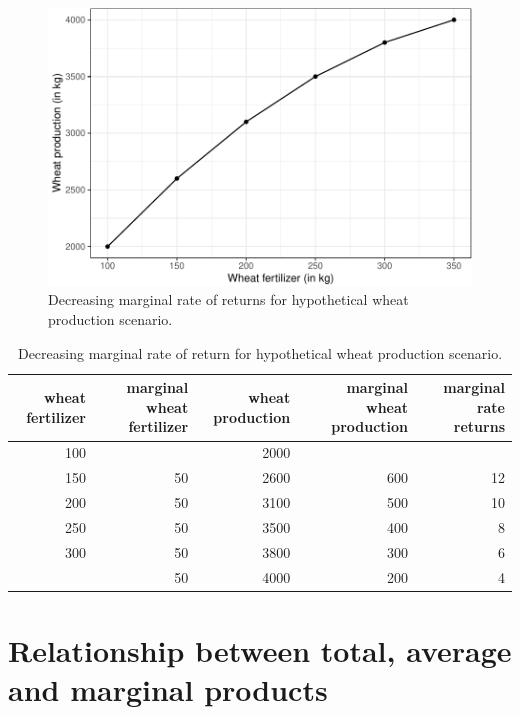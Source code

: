 \documentclass[12pt,ignorenonframetext,aspectratio=169]{beamer}
\begin{document}
\begin{frame}{}
\protect\hypertarget{section-5}{}
\begin{figure}
\includegraphics[width=0.7\linewidth]{04-production_function_files/figure-beamer/nitrogen-wheat-dmr-fig-1} \caption{Decreasing marginal rate of returns for hypothetical wheat production scenario.}\label{fig:nitrogen-wheat-dmr-fig}
\end{figure}
\end{frame}

\begin{frame}{}
\protect\hypertarget{section-6}{}
\begin{table}

\caption{\label{tab:nitrogen-wheat-dmr-tab}Decreasing marginal rate of return for hypothetical wheat production scenario.}
\centering
\fontsize{6}{8}\selectfont
\begin{tabular}[t]{rrrrr}
\toprule
wheat fertilizer & marginal wheat fertilizer & wheat production & marginal wheat production & marginal rate returns\\
\midrule
100 &  & 2000 &  & \\
150 & 50 & 2600 & 600 & 12\\
200 & 50 & 3100 & 500 & 10\\
250 & 50 & 3500 & 400 & 8\\
300 & 50 & 3800 & 300 & 6\\
\addlinespace
350 & 50 & 4000 & 200 & 4\\
\bottomrule
\end{tabular}
\end{table}
\end{frame}

\hypertarget{relationship-between-total-average-and-marginal-products}{%
\section{Relationship between total, average and marginal
products}\label{relationship-between-total-average-and-marginal-products}}
\end{document}
